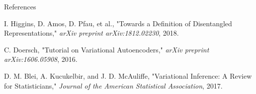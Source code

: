 \begin{frame}[allowframebreaks]{References}
\begin{thebibliography}{99}
        I. Higgins, D. Amos, D. Pfau, et al.,
        \newblock "Towards a Definition of Disentangled Representations,"
        \newblock \emph{arXiv preprint arXiv:1812.02230}, 2018.

        C. Doersch,
        \newblock "Tutorial on Variational Autoencoders,"
        \newblock \emph{arXiv preprint arXiv:1606.05908}, 2016.

        D. M. Blei, A. Kucukelbir, and J. D. McAuliffe,
        \newblock "Variational Inference: A Review for Statisticians,"
        \newblock \emph{Journal of the American Statistical Association}, 2017.
    \end{thebibliography}
\end{frame}